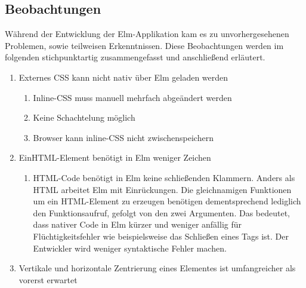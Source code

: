\subsection{Beobachtungen}
\label{sec:Beobachtungen}
Während der Entwicklung der Elm-Applikation kam es zu unvorhergesehenen Problemen, sowie teilweisen Erkenntnissen. Diese Beobachtungen werden im folgenden stichpunktartig zusammengefasst und anschließend erläutert.
\begin{enumerate}[label*=\arabic*.]

\item Externes \ac{CSS} kann nicht nativ über Elm geladen werden
	\begin{enumerate}[label*=\arabic*.]
		\item Inline-\ac{CSS} muss manuell mehrfach abgeändert werden
		\item Keine Schachtelung möglich
		\item Browser kann inline-\ac{CSS} nicht zwischenspeichern
	\end{enumerate}
\item Ein\ac{HTML}-Element benötigt in Elm weniger Zeichen
	\begin{enumerate}[label*=\arabic*.]
		\item \ac{HTML}-Code benötigt in Elm keine schließenden Klammern. Anders als \ac{HTML} arbeitet Elm mit Einrückungen. Die gleichnamigen Funktionen um ein \ac{HTML}-Element zu erzeugen benötigen dementsprechend lediglich den Funktionsaufruf, gefolgt von den zwei Argumenten. Das bedeutet, dass nativer Code in Elm kürzer und weniger anfällig für Flüchtigkeitsfehler wie beispielsweise das Schließen eines Tags ist. Der Entwickler wird weniger syntaktische Fehler machen.
	\end{enumerate}
\item Vertikale und horizontale Zentrierung eines Elementes ist umfangreicher als vorerst erwartet
	\begin{enumerate}[label*=\arabic*.]

\end{enumerate}
\end{enumerate}
